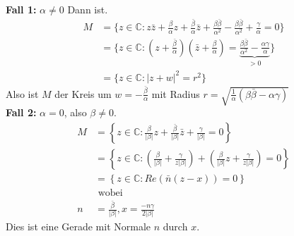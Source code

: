 \begin{problem*}[1]
\begin{itemize}
	\textbf{Fall 1:} $ \alpha \neq 0$ Dann ist.
	\begin{align*}
	M &= \{ z \in \mathbb{C} : z \bar{z} + \frac{\beta}{\alpha}z + \frac{\bar{\beta}}{\alpha} \bar{z} + \frac{\beta \bar{\beta}}{\alpha^2} - \frac{\beta \bar{\beta}}{\alpha^2} + \frac{\gamma}{\alpha} = 0\} \\
	&= \{ z \in \mathbb{C} : (z + \frac{\bar{\beta}}{\alpha})(\bar{z} + \frac{\beta}{\alpha}) = \underbrace{\frac{\beta \bar{\beta}}{\alpha^2} - \frac{\alpha \gamma}{\alpha}}_{ > 0 } \} \\
	&= \{ z \in \mathbb{C} : \vert z + w \vert^2 = r^2\}
	\end{align*}
	Also ist $ M $ der Kreis um $ w = -\frac{\bar{\beta}}{\alpha}$ mit Radius $ r = \sqrt{ \frac{1}{\alpha} (\beta \bar{\beta} - \alpha \gamma) }$ \\
	\textbf{Fall 2:} $ \alpha = 0$, also $\beta \neq 0$. \\
	\begin{align*}
	M &= \left\{ z \in \mathbb{C} : \frac{\beta}{\vert \beta \vert} z + \frac{\bar{\beta}}{\vert \beta \vert} \bar{z} + \frac{\gamma}{\vert \beta \vert} = 0 \right\} \\
	&= \left\{ z \in \mathbb{C} : \left(\frac{\beta}{\vert \beta \vert} +  \frac{\gamma}{z\vert \beta \vert}\right) + \left(\frac{\beta}{\vert \beta \vert}z + \frac{\gamma}{z\vert \beta \vert}\right)= 0 \right\} \\
	&= \left \{  z \in \mathbb{C} : Re(\bar{n}(z-x)) = 0 \right\} \\
	&\text{ wobei } \\
	n &= \frac{\bar{\beta}}{\vert \beta \vert}, x = \frac{-n \gamma}{2\vert \beta \vert}	
	\end{align*}
	Dies ist eine Gerade mit Normale $ n $ durch $ x $.
\end{itemize}
\end{problem*}
